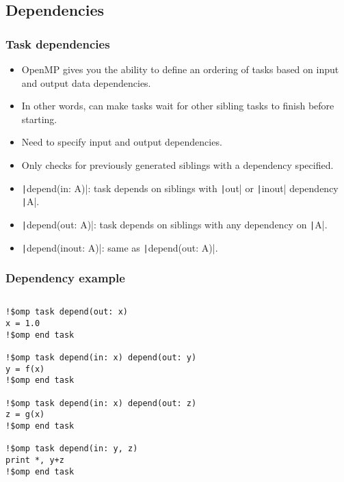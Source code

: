 \documentclass{beamer}
\begin{document}
\subsection{Dependencies}
\begin{frame}
\frametitle{Task dependencies}
\begin{itemize}
  \item OpenMP gives you the ability to define an ordering of tasks based on input and output data dependencies.
  \item In other words, can make tasks wait for other sibling tasks to finish before starting.
  \item Need to specify input and output dependencies.
  \item Only checks for previously generated siblings with a dependency specified.
  \item \texttt|depend(in: A)|: task depends on siblings with \texttt|out| or \texttt|inout| dependency \texttt|A|.
  \item \texttt|depend(out: A)|: task depends on siblings with any dependency on \texttt|A|.
  \item \texttt|depend(inout: A)|: same as \texttt|depend(out: A)|.
\end{itemize}
\end{frame}

\begin{frame}[fragile]
\frametitle{Dependency example}
\begin{columns}
\begin{column}{0.7\textwidth}
\begin{verbatim}
!$omp task depend(out: x)
x = 1.0
!$omp end task

!$omp task depend(in: x) depend(out: y)
y = f(x)
!$omp end task

!$omp task depend(in: x) depend(out: z)
z = g(x)
!$omp end task

!$omp task depend(in: y, z)
print *, y+z
!$omp end task
\end{verbatim}
\end{column}

\begin{column}{0.3\textwidth}
\end{column}
\end{columns}
\end{frame}
\end{document}
